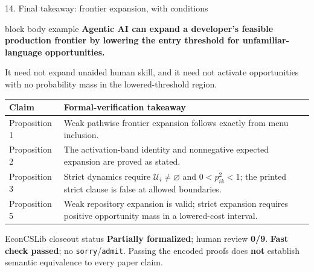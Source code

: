 \documentclass[aspectratio=169,10pt]{beamer}
\begin{document}
\begin{frame}{14. Final takeaway: frontier expansion, with conditions}
  \begin{beamercolorbox}[wd=\textwidth,sep=0.16cm,rounded=true]{block body example}
    \centering
    {\normalsize\bfseries Agentic AI can expand a developer's feasible production frontier by lowering the entry threshold for unfamiliar-language opportunities.}\par
    \smallskip
    It need not expand unaided human skill, and it need not activate opportunities with no probability mass in the lowered-threshold region.
  \end{beamercolorbox}

  \vspace{0.14cm}
  {\small\begin{tabular}{@{}p{}p{}@{}}
    \toprule
    \textbf{Claim} & \textbf{Formal-verification takeaway}\\
    \midrule
    Proposition 1 & Weak pathwise frontier expansion follows exactly from menu inclusion.\\
    Proposition 2 & The activation-band identity and nonnegative expected expansion are proved as stated.\\
    Proposition 3 & Strict dynamics require $\mathcal U_i\ne\varnothing$ and $0<p^2_{ik}<1$; the printed strict clause is false at allowed boundaries.\\
    Proposition 5 & Weak repository expansion is valid; strict expansion requires positive opportunity mass in a lowered-cost interval.\\
    \bottomrule
  \end{tabular}}

  \vspace{0.02cm}
  \begin{alertblock}{EconCSLib closeout status}
    \scriptsize \textbf{Partially formalized}; human review \textbf{0/9}. \textbf{Fast check passed}; no \texttt{sorry}/\texttt{admit}. Passing the encoded proofs does \textbf{not} establish semantic equivalence to every paper claim.
  \end{alertblock}
\end{frame}
\end{document}
